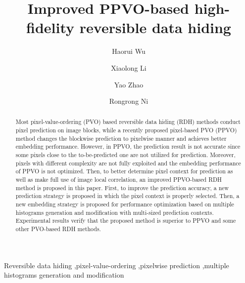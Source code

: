 \documentclass[review,3p,10pt,sort&compress]{elsarticle}
\begin{document}
\begin{frontmatter}

\title {Improved PPVO-based high-fidelity reversible data hiding}

\author{Haorui Wu}

\author{Xiaolong Li}

\author{Yao Zhao}

\author{Rongrong Ni}

\address[mymainaddress]{Institute of Information Science, Beijing Jiaotong University, Beijing 100044, China}
\address[mysecondaryaddress]{Beijing Key Laboratory of Advanced Information Science and Network Technology, Beijing 100044, China}

\begin{abstract}
Most pixel-value-ordering (PVO) based reversible data hiding (RDH) methods conduct pixel prediction on image blocks, while a recently proposed pixel-based PVO (PPVO) method changes the blockwise prediction to pixelwise manner and achieves better embedding performance. However, in PPVO, the prediction result is not accurate since some pixels close to the to-be-predicted one are not utilized for prediction. Moreover, pixels with different complexity are not fully exploited and the embedding performance of PPVO is not optimized. Then, to better determine pixel context for prediction as well as make full use of image local correlation, an improved PPVO-based RDH method is proposed in this paper. First, to improve the prediction accuracy, a new prediction strategy is proposed in which the pixel context is properly selected. Then, a new embedding strategy is proposed for performance optimization based on multiple histograms generation and modification with multi-sized prediction contexts. Experimental results verify that the proposed method is superior to PPVO and some other PVO-based RDH methods.

\end{abstract}


\begin{keyword}
   Reversible data hiding \sep pixel-value-ordering \sep pixelwise prediction \sep multiple histograms generation and modification
\end{keyword}

\end{frontmatter}

\end{document}
